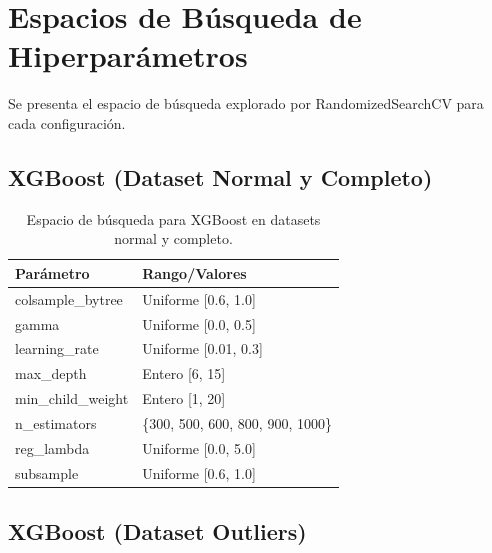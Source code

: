 \documentclass[conference]{IEEEtran}
\begin{document}
    \section{Espacios de Búsqueda de Hiperparámetros}

    Se presenta el espacio de búsqueda explorado por RandomizedSearchCV para cada configuración.

    \subsection{XGBoost (Dataset Normal y Completo)}

    \begin{table}[H]
        \centering
        \caption{Espacio de búsqueda para XGBoost en datasets normal y completo.}
        \label{tab:search_xgb_normal}
        \begin{tabular}{ll}
            \toprule
            \textbf{Parámetro} & \textbf{Rango/Valores} \\
            \midrule
            colsample\_bytree & Uniforme [0.6, 1.0] \\
            gamma             & Uniforme [0.0, 0.5] \\
            learning\_rate    & Uniforme [0.01, 0.3] \\
            max\_depth        & Entero [6, 15] \\
            min\_child\_weight & Entero [1, 20] \\
            n\_estimators     & \{300, 500, 600, 800, 900, 1000\} \\
            reg\_lambda       & Uniforme [0.0, 5.0] \\
            subsample         & Uniforme [0.6, 1.0] \\
            \bottomrule
        \end{tabular}
    \end{table}

    \subsection{XGBoost (Dataset Outliers)}
\end{document}
